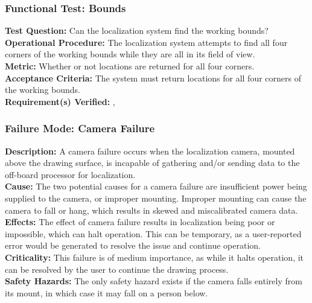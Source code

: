 \subsubsection{Functional Test: Bounds}
\label{sec:localization_ft_bounds}
\textbf{Test Question:} Can the localization system find the working bounds?\\
\textbf{Operational Procedure:} The localization system attempts to find all four corners of the working bounds while they are all in its field of view.\\
\textbf{Metric:} Whether or not locations are returned for all four corners.\\
\textbf{Acceptance Criteria:} The system must return locations for all four corners of the working bounds.\\
\textbf{Requirement(s) Verified:} , 

\subsubsection{Failure Mode: Camera Failure}
\label{sec:localization_fm_cam}
\textbf{Description:} A camera failure occurs when the localization camera, mounted above the drawing surface, is incapable of gathering and/or sending data to the off-board processor for localization.\\
\textbf{Cause:} The two potential causes for a camera failure are insufficient power being supplied to the camera, or improper mounting. Improper mounting can cause the camera to fall or hang, which results in skewed and miscalibrated camera data.\\
\textbf{Effects:}  The effect of camera failure results in localization being poor or impossible, which can halt operation. This can be temporary, as a user-reported error would be generated to resolve the issue and continue operation.\\
\textbf{Criticality:}  This failure is of medium importance, as while it halts operation, it can be resolved by the user to continue the drawing process.\\
\textbf{Safety Hazards:} The only safety hazard exists if the camera falls entirely from its mount, in which case it may fall on a person below. \\

